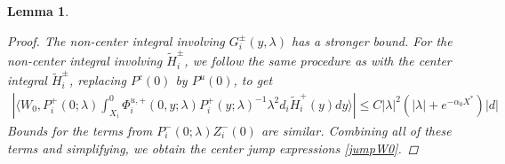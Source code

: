 \documentclass[10pt,reqno]{amsart}
\theoremstyle{plain}
\newtheorem{lemma}[theorem]{Lemma}
\theoremstyle{definition}
\theoremstyle{remark}
\numberwithin{theorem}{section}
\numberwithin{equation}{section}
\begin{document}
\begin{lemma}
\begin{proof}
The non-center integral involving $G_i^\pm(y, \lambda)$ has a stronger bound. For the non-center integral involving $\tilde{H}_i^\pm$, we follow the same procedure as with the center integral $\tilde{H}_i^\pm$, replacing $P^c(0)$ by $P^u(0)$, to get
\begin{align*}
\left|  \langle W_0, P_i^+(0; \lambda) \int_{X_i}^0 \Phi_i^{u,+}(0, y; \lambda) P_i^+(y; \lambda)^{-1} \lambda^2 d_i \tilde{H}_i^+(y) dy \rangle \right| \leq C |\lambda|^2 (|\lambda| + e^{- \alpha_0 X^*}) |d|
\end{align*}
Bounds for the terms from $P_i^-(0; \lambda) Z_i^-(0)$ are similar. Combining all of these terms and simplifying, we obtain the center jump expressions \cref{jumpW0}.
\end{proof}
\end{lemma}
\end{document}
